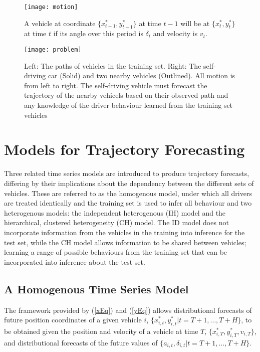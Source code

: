 \documentclass[12pt,a4paper]{article}\usepackage[]{graphicx}\usepackage[]{color}
\begin{document}
\begin{figure}
\centering
\texttt{[image: motion]}
\caption{A vehicle at coordinate $\{x^*_{t-1}, y^*_{t-1}\}$ at time $t-1$ will be at $\{x^*_t, y^*_t\}$ at time $t$ if its angle over this period is $\delta_t$ and velocity is $v_t$.}
\label{fig:motion}
\end{figure}

\begin{figure}
\centering
\texttt{[image: problem]}
\caption{Left: The paths of vehicles in the training set. Right: The self-driving car (Solid) and two nearby vehicles (Outlined). All motion is from left to right. The self-driving vehicle must forecast the trajectory of the nearby vehicels based on their observed path and any knowledge of the driver behaviour learned from the training set vehicles}
\label{fig:problem}
\end{figure}

\section{Models for Trajectory Forecasting}
\label{sec:models}

Three related time series models are introduced to produce trajectory forecasts, differing by their implications about the dependency between the different sets of vehicles. These are referred to as the homogenous model, under which all drivers are treated identically and the training set is used to infer all behaviour and two heterogenous models: the independent heterogenous (IH) model and the hierarchical, clustered heterogeneity (CH) model. The ID model does not incorporate information from the vehicles in the training into inference for the test set, while the CH model allows information to be shared between vehicles; learning a range of possible behaviours from the training set that can be incorporated into inference about the test set. 
\\

\subsection{A Homogenous Time Series Model}
\label{subsec:homogenous}

The framework provided by (\ref{xEq}) and (\ref{yEq}) allows distributional forecasts of future position coordinates of a given vehicle $i$, $\{x^*_{i, t}, y^*_{i, t} | t = T + 1, \dots, T+H\}$, to be obtained given the position and velocity of a vehicle at time $T$, $\{x^*_{i, T}, y^*_{i, T}, v_{i, T}\}$, and distributional forecasts of the future values of $\{a_{i, t}, \delta_{i, t} | t = T + 1, \dots, T+H\}$.  
\\
\end{document}
